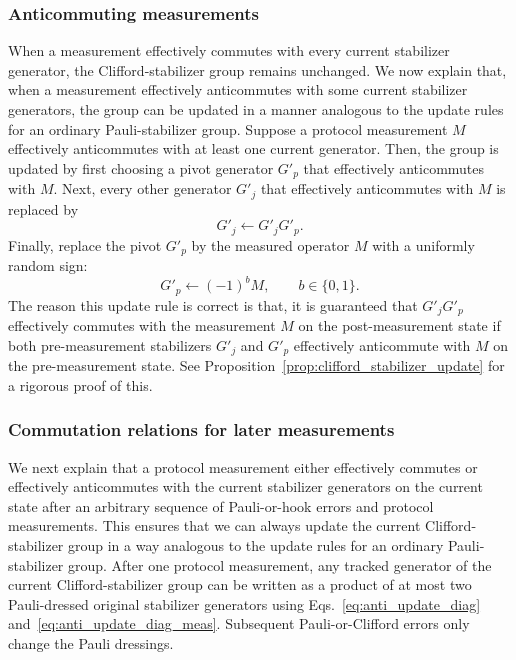 \documentclass[
 reprint,
 amsmath,amssymb,
 pra,superscriptaddress, nofootinbib
]{revtex4-2}
\theoremstyle{definition}
\theoremstyle{plain}
\begin{document}
\subsubsection{Anticommuting measurements}

When a measurement effectively commutes with every current stabilizer generator, the Clifford-stabilizer group remains unchanged. We now explain that, when a measurement effectively anticommutes with some current stabilizer generators, the group can be updated in a manner analogous to the update rules for an ordinary Pauli-stabilizer group.
Suppose a protocol measurement $M$ effectively anticommutes with at least one current generator.
Then, the group is updated by first choosing a pivot generator $G'_p$ that effectively anticommutes with $M$. Next, every other generator $G'_j$ that effectively anticommutes with $M$ is replaced by
\begin{equation}
G'_j\leftarrow G'_jG'_p.
\label{eq:anti_update_diag}
\end{equation}
Finally, replace the pivot $G'_p$ by the measured operator $M$ with a uniformly random sign:
\begin{equation}
G'_p\leftarrow (-1)^b M,
\qquad b\in\{0,1\}.
\label{eq:anti_update_diag_meas}
\end{equation}
The reason this update rule is correct is that, it is guaranteed that $G'_jG'_p$ effectively commutes with the measurement $M$ on the post-measurement state if both pre-measurement stabilizers $G'_j$ and $G'_p$ effectively anticommute with $M$ on the pre-measurement state. See Proposition~\ref{prop:clifford_stabilizer_update} for a rigorous proof of this.

\subsubsection{Commutation relations for later measurements}

We next explain that a protocol measurement either effectively commutes or effectively anticommutes with the current stabilizer generators on the current state after an arbitrary sequence of Pauli-or-hook errors and protocol measurements. This ensures that we can always update the current Clifford-stabilizer group in a way analogous to the update rules for an ordinary Pauli-stabilizer group.
After one protocol measurement, any tracked generator of the current Clifford-stabilizer group can be written as a product of at most two Pauli-dressed original stabilizer generators using Eqs.~\eqref{eq:anti_update_diag} and~\eqref{eq:anti_update_diag_meas}. Subsequent Pauli-or-Clifford errors only change the Pauli dressings.
\end{document}
